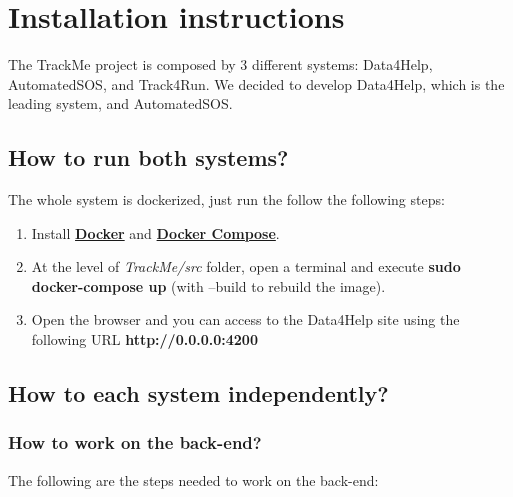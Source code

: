 \documentclass[a4paper, hidelinks, 12pt]{report}
\begin{document}
	\chapter{Installation instructions}
The TrackMe project is composed by 3 different systems: Data4Help, AutomatedSOS, and Track4Run. We decided to develop Data4Help, which is the leading system, and AutomatedSOS.

	\section{How to run both systems?}
	The whole system is dockerized, just run the follow the following steps:

	\begin{enumerate}
	\item Install \href{https://docs.docker.com/install/}{\textbf{Docker}} and \href{https://docs.docker.com/compose/install/}{\textbf{Docker Compose}}.
	\item At the level of \textit{TrackMe/src} folder, open a terminal and execute
	\textbf{ sudo docker-compose up} (with --build to rebuild the image).
	\item Open the browser and you can access to the Data4Help site using the following URL
		\textbf{http://0.0.0.0:4200}
	\end{enumerate}
	 
	\section{How to each system independently?}
	\subsection{How to work on the back-end?}
	The following are the steps needed to work on the back-end:
	
\end{document}
